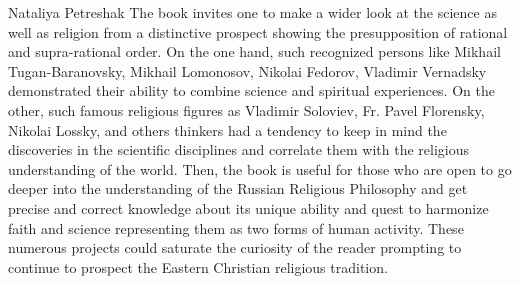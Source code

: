 \begin{recengenv}{Nataliya Petreshak}
The book invites one to make a wider look at the science as well as religion from a
distinctive prospect showing the presupposition of rational and supra-rational order. On the one hand, such recognized
persons like Mikhail Tugan-Baranovsky, Mikhail Lomonosov, Nikolai Fedorov, Vladimir Vernadsky demonstrated their
ability to combine science and spiritual experiences. On the other, such famous religious figures as Vladimir
Soloviev, Fr. Pavel Florensky, Nikolai Lossky, and others thinkers had a tendency to keep in mind the discoveries in
the scientific disciplines and correlate them with the religious understanding of the world. Then, the book is useful for
those who are open to go deeper into the understanding of the Russian Religious Philosophy and get precise and correct
knowledge about its unique ability and quest to harmonize faith and science representing them as two forms of human
activity. These numerous projects could saturate the curiosity of the reader prompting to continue to prospect the
Eastern Christian religious tradition.



\end{recengenv}

